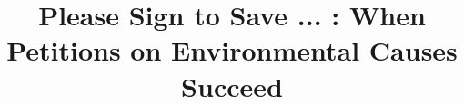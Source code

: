 \documentclass[letterpaper]{article}
\begin{document}

\title{Please Sign to Save ... : When Petitions on Environmental Causes Succeed}


\newcommand{\etal}[1]{#1~\emph{et al.}}

%
%
%

\maketitle
\end{document}
